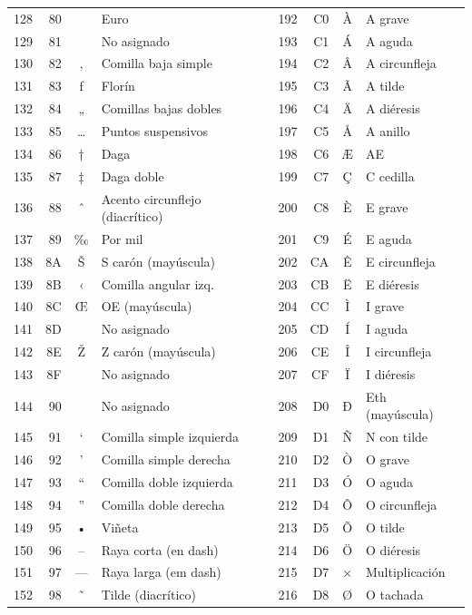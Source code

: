 \documentclass[12pt,twoside]{book}
\begin{document}
\begin{longtable}{r r c l r r c l}
						128 & 80 & \texteuro & Euro & 192 & C0 & À & A grave \\
						129 & 81 &  & No asignado & 193 & C1 & Á & A aguda \\
						130 & 82 & ‚ & Comilla baja simple & 194 & C2 & Â & A circunfleja \\
						131 & 83 & ƒ & Florín & 195 & C3 & Ã & A tilde \\
						132 & 84 & „ & Comillas bajas dobles & 196 & C4 & Ä & A diéresis \\
						133 & 85 & … & Puntos suspensivos & 197 & C5 & Å & A anillo \\
						134 & 86 & † & Daga & 198 & C6 & Æ & AE \\
						135 & 87 & ‡ & Daga doble & 199 & C7 & Ç & C cedilla \\
						136 & 88 & ˆ & Acento circunflejo (diacrítico) & 200 & C8 & È & E grave \\
						137 & 89 & ‰ & Por mil & 201 & C9 & É & E aguda \\
						138 & 8A & Š & S carón (mayúscula) & 202 & CA & Ê & E circunfleja \\
						139 & 8B & ‹ & Comilla angular izq. & 203 & CB & Ë & E diéresis \\
						140 & 8C & Œ & OE (mayúscula) & 204 & CC & Ì & I grave \\
						141 & 8D &  & No asignado & 205 & CD & Í & I aguda \\
						142 & 8E & Ž & Z carón (mayúscula) & 206 & CE & Î & I circunfleja \\
						143 & 8F &  & No asignado & 207 & CF & Ï & I diéresis \\
						144 & 90 &  & No asignado & 208 & D0 & Ð & Eth (mayúscula) \\
						145 & 91 & ‘ & Comilla simple izquierda & 209 & D1 & Ñ & N con tilde \\
						146 & 92 & ’ & Comilla simple derecha & 210 & D2 & Ò & O grave \\
						147 & 93 & “ & Comilla doble izquierda & 211 & D3 & Ó & O aguda \\
						148 & 94 & ” & Comilla doble derecha & 212 & D4 & Ô & O circunfleja \\
						149 & 95 & • & Viñeta & 213 & D5 & Õ & O tilde \\
						150 & 96 & – & Raya corta (en dash) & 214 & D6 & Ö & O diéresis \\
						151 & 97 & — & Raya larga (em dash) & 215 & D7 & × & Multiplicación \\
						152 & 98 & ˜ & Tilde (diacrítico) & 216 & D8 & Ø & O tachada \\

\end{longtable}
\end{document}
